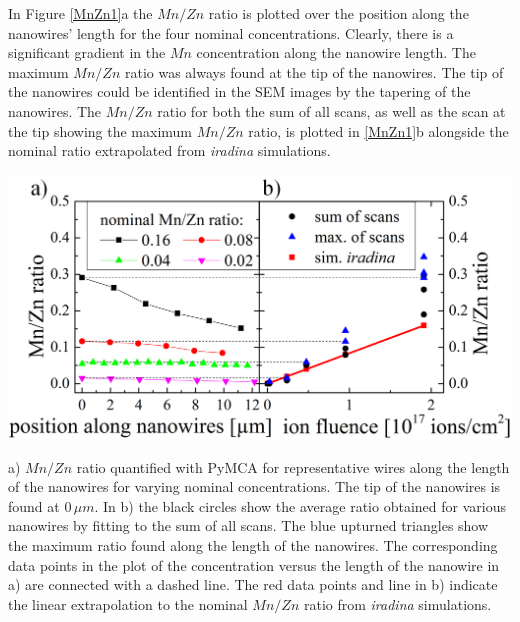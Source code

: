 In Figure \ref{MnZn1}a the $Mn/Zn$ ratio is plotted over the position along the nanowires' length for the four nominal concentrations. Clearly, there is a significant gradient in the $Mn$ concentration along the nanowire length. The maximum $Mn/Zn$ ratio was always found at the tip of the nanowires. The tip of the nanowires could be identified in the SEM images by the tapering of the nanowires. The $Mn/Zn$ ratio for both the sum of all scans, as well as the scan at the tip showing the maximum $Mn/Zn$ ratio, is plotted in \ref{MnZn1}b alongside the nominal ratio extrapolated from \emph{iradina} simulations.

\begin{Figure}
	\centering
		\includegraphics[width=.8\textwidth]{images/MnZn1.png}
	\caption{a) $Mn/Zn$ ratio quantified with PyMCA for representative wires along the length of the nanowires for varying nominal concentrations. The tip of the nanowires is found at $0\,\mu m$. In b) the black circles show the average ratio obtained for various nanowires by fitting to the sum of all scans. The blue upturned triangles show the maximum ratio found along the length of the nanowires. The corresponding data points in the plot of the concentration versus the length of the nanowire in a) are connected with a dashed line. The red data points and line in b) indicate the linear extrapolation to the nominal $Mn/Zn$ ratio from \emph{iradina} simulations.}
	\label{MnZn1}
\end{Figure} 
 
